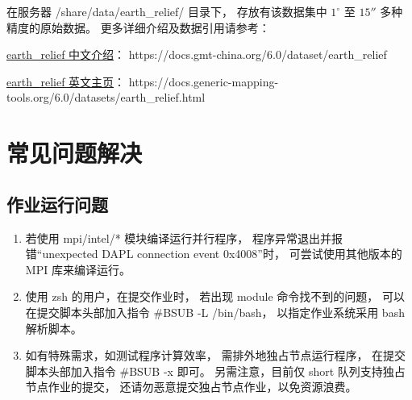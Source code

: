 \documentclass[UTF8]{ctexart}
\newcommand{\mynnote}[1]{\colorbox{gray!15}{\color{blue!65}#1}}
\begin{document}
在服务器 /share/data/earth\_relief/ 目录下，
存放有该数据集中 $1^\circ$ 至 $15''$ 多种精度的原始数据。
更多详细介绍及数据引用请参考：

\href{https://docs.gmt-china.org/6.0/dataset/earth_relief}{earth\_relief 中文介绍}：
https://docs.gmt-china.org/6.0/dataset/earth\_relief

\href{https://docs.generic-mapping-tools.org/6.0/datasets/earth_relief.html}{earth\_relief 英文主页}：
https://docs.generic-mapping-tools.org/6.0/datasets/earth\_relief.html

\section{常见问题解决}
\subsection{作业运行问题}
\begin{enumerate}[\hspace{10mm}1、]
  \item 若使用 mpi/intel/* 模块编译运行并行程序，
    程序异常退出并报错“unexpected DAPL connection event 0x4008”时，
    可尝试使用其他版本的 MPI 库来编译运行。
  \item 使用 zsh 的用户，在提交作业时，
    若出现 module 命令找不到的问题，
    可以在提交脚本头部加入指令 \mynnote{\#BSUB -L /bin/bash}，
    以指定作业系统采用 bash 解析脚本。
  \item 如有特殊需求，如测试程序计算效率，
    需排外地独占节点运行程序，
    在提交脚本头部加入指令 \mynnote{\#BSUB -x} 即可。
    另需注意，目前仅 short 队列支持独占节点作业的提交，
    还请勿恶意提交独占节点作业，以免资源浪费。
\end{enumerate}
\end{document}
